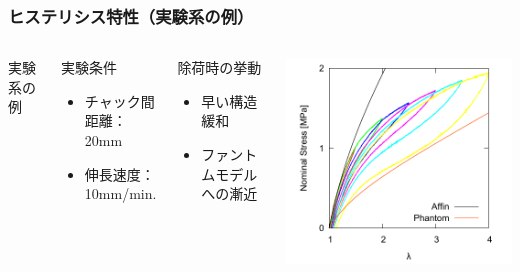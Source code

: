 \documentclass[11pt, dvipdfmx]{beamer}
\begin{document}
\begin{frame}
\frametitle{ヒステリシス特性（実験系の例）}
\begin{columns}[totalwidth=1\textwidth]
{\Large 実験系の例}
\small
\begin{block}{実験条件}
\begin{itemize}
\item
チャック間距離：20mm
\item
伸長速度：10mm/min.
\end{itemize}
\end{block}
\begin{alertblock}{除荷時の挙動}
\begin{itemize}
\item
早い構造緩和
\item
ファントムモデルへの漸近
\end{itemize}
\end{alertblock}
\centering
\includegraphics[width=\textwidth]{./fig/Hysteresis_10mm.pdf}
\end{columns}
\end{frame}
\end{document}
